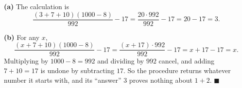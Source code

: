 \textbf{(a)} The calculation is
\[\dfrac{(3+7+10)(1000-8)}{992}-17=\dfrac{20\cdot992}{992}-17=20-17=\boxed{3}.\]

\textbf{(b)} For any $x$,
\[\dfrac{(x+7+10)(1000-8)}{992}-17=\dfrac{(x+17)\cdot992}{992}-17=x+17-17=x.\]
Multiplying by $1000-8=992$ and dividing by $992$ cancel, and adding $7+10=17$ is undone by subtracting $17$. So the procedure returns whatever number it starts with, and its ``answer'' $3$ proves nothing about $1+2$. $\blacksquare$
